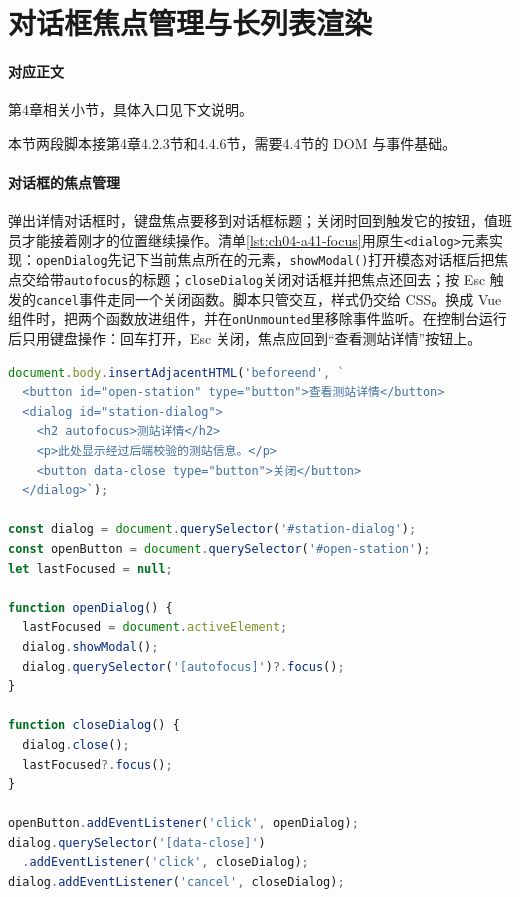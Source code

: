 \section{对话框焦点管理与长列表渲染}\label{app:ext-fe-focus-list}

\paragraph{对应正文}第4章相关小节，具体入口见下文说明。

本节两段脚本接第4章4.2.3节和4.4.6节，需要4.4节的 DOM 与事件基础。

\paragraph{对话框的焦点管理}弹出详情对话框时，键盘焦点要移到对话框标题；关闭时回到触发它的按钮，值班员才能接着刚才的位置继续操作。清单\ref{lst:ch04-a41-focus}用原生\texttt{<dialog>}元素实现：\texttt{openDialog}先记下当前焦点所在的元素，\texttt{showModal()}打开模态对话框后把焦点交给带\texttt{autofocus}的标题；\texttt{closeDialog}关闭对话框并把焦点还回去；按 Esc 触发的\texttt{cancel}事件走同一个关闭函数。脚本只管交互，样式仍交给 CSS。换成 Vue 组件时，把两个函数放进组件，并在\texttt{onUnmounted}里移除事件监听。在控制台运行后只用键盘操作：回车打开，Esc 关闭，焦点应回到“查看测站详情”按钮上。

\begin{lstlisting}[label={lst:ch04-a41-focus},language=JavaScript,caption={监测详情对话框的焦点管理}]
document.body.insertAdjacentHTML('beforeend', `
  <button id="open-station" type="button">查看测站详情</button>
  <dialog id="station-dialog">
    <h2 autofocus>测站详情</h2>
    <p>此处显示经过后端校验的测站信息。</p>
    <button data-close type="button">关闭</button>
  </dialog>`);

const dialog = document.querySelector('#station-dialog');
const openButton = document.querySelector('#open-station');
let lastFocused = null;

function openDialog() {
  lastFocused = document.activeElement;
  dialog.showModal();
  dialog.querySelector('[autofocus]')?.focus();
}

function closeDialog() {
  dialog.close();
  lastFocused?.focus();
}

openButton.addEventListener('click', openDialog);
dialog.querySelector('[data-close]')
  .addEventListener('click', closeDialog);
dialog.addEventListener('cancel', closeDialog);
\end{lstlisting}

